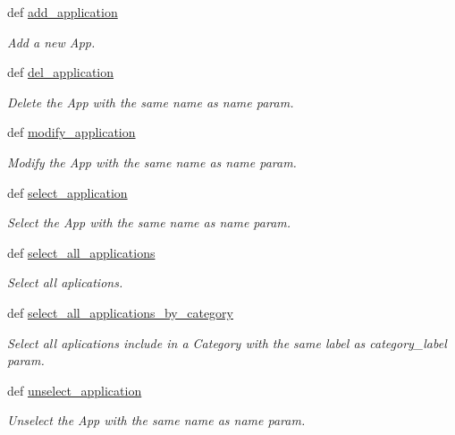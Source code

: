 \begin{CompactItemize}
def \hyperlink{classwinsol_1_1WinSOL_5e1be4178d5800b698685f34c55028d4}{add\_\-application}
\begin{CompactList}\small\item\em Add a new App. \item\end{CompactList}\item 
def \hyperlink{classwinsol_1_1WinSOL_423da76b9737ecb160711bc9c861189c}{del\_\-application}
\begin{CompactList}\small\item\em Delete the App with the same name as {\em name\/} param. \item\end{CompactList}\item 
def \hyperlink{classwinsol_1_1WinSOL_bfe4c52dcc7034e403048d9f27cd83c6}{modify\_\-application}
\begin{CompactList}\small\item\em Modify the App with the same name as {\em name\/} param. \item\end{CompactList}\item 
def \hyperlink{classwinsol_1_1WinSOL_e72b39dfc299115e55f8e959da1dad57}{select\_\-application}
\begin{CompactList}\small\item\em Select the App with the same name as {\em name\/} param. \item\end{CompactList}\item 
def \hyperlink{classwinsol_1_1WinSOL_328429378b2ee80ceaebf0c36b8a979c}{select\_\-all\_\-applications}
\begin{CompactList}\small\item\em Select all aplications. \item\end{CompactList}\item 
def \hyperlink{classwinsol_1_1WinSOL_857737591d3b4d78cc949aa04fdee178}{select\_\-all\_\-applications\_\-by\_\-category}
\begin{CompactList}\small\item\em Select all aplications include in a Category with the same label as {\em category\_\-label\/} param. \item\end{CompactList}\item 
def \hyperlink{classwinsol_1_1WinSOL_44de84f8ca15802c0c66d3767001e8d9}{unselect\_\-application}
\begin{CompactList}\small\item\em Unselect the App with the same name as {\em name\/} param. \item\end{CompactList}\item 

\end{CompactItemize}
